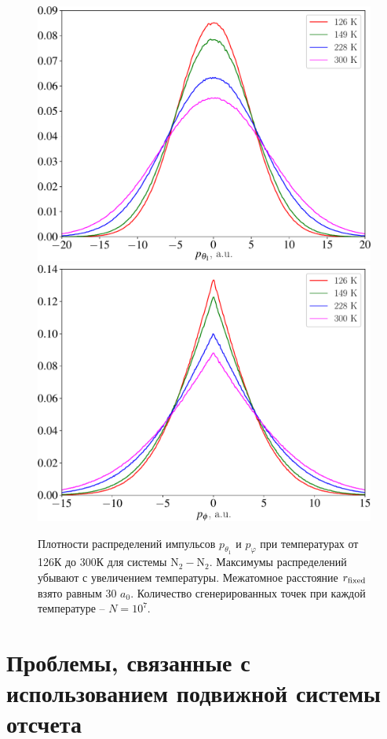 \begin{figure}[H]
    \centering
    \includegraphics[width=0.75\linewidth]{./pictures/polyatom_distributions/pTheta1-crop.pdf} \\
    \includegraphics[width=0.75\linewidth]{./pictures/polyatom_distributions/pPhi-crop.pdf}
    \caption{Плотности распределений импульсов $p_{\theta_1}$ и $p_\varphi$ при температурах от 126К до 300К для системы N$_2-$N$_2$. Максимумы распределений убывают с увеличением температуры. Межатомное расстояние $r_\text{fixed}$ взято равным 30 $a_0$. Количество сгенерированных точек при каждой температуре -- $N = 10^7$.}
    \label{fig:polyatom-distributions}
\end{figure}

\section{Проблемы, связанные с использованием подвижной системы отсчета}

